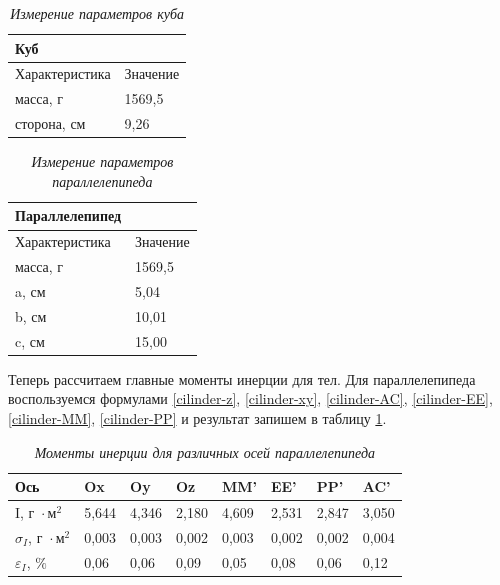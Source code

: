 \documentclass[a4paper,12pt]{article}
\begin{document}
\begin{table}[!ht]
    \centering
    \begin{tabular}{|l|l|}
    \hline
        \textbf{Куб} & ~ \\ \hline
        Характеристика & Значение \\ \hline
        масса, г & 1569,5 \\ \hline
        сторона, см & 9,26 \\ \hline
    \end{tabular}\caption{\textit{Измерение параметров куба}}
\end{table}

\begin{table}[!ht]
    \centering
    \begin{tabular}{|l|l|}
    \hline
        \textbf{Параллелепипед} & ~ \\ \hline
        Характеристика & Значение \\ \hline
        масса, г & 1569,5 \\ \hline
        a, см & 5,04 \\ \hline
        b, см & 10,01 \\ \hline
        c, см & 15,00 \\ \hline
    \end{tabular}\caption{\textit{Измерение параметров параллелепипеда}}
\end{table}

Теперь рассчитаем главные моменты инерции для тел. Для параллелепипеда воспользуемся формулами \eqref{cilinder-z}, \eqref{cilinder-xy}, \eqref{cilinder-AC}, \eqref{cilinder-EE}, \eqref{cilinder-MM}, \eqref{cilinder-PP} и результат запишем в таблицу \ref{paral-i}.

\begin{table}[!ht]
    \centering
    \begin{tabular}{|l|l|l|l|l|l|l|l|}
    \hline
        Ось & Ox & Oy & Oz & MM' & EE' & PP' & AC' \\ \hline
        I, $\text{г } \cdot \text{м}^2$ & 5,644 & 4,346 & 2,180 & 4,609 & 2,531 & 2,847 & 3,050 \\ \hline
        $\sigma_{I}$, $\text{г } \cdot \text{м}^2$ & 0,003 & 0,003 & 0,002 & 0,003 & 0,002 & 0,002 & 0,004 \\ \hline
        $\varepsilon_{I}$, $\%$ & 0,06 & 0,06 & 0,09 & 0,05 & 0,08 & 0,06 & 0,12 \\ \hline
    \end{tabular}\caption{\textit{Моменты инерции для различных осей параллелепипеда}}\label{paral-i}
\end{table}
\end{document}
